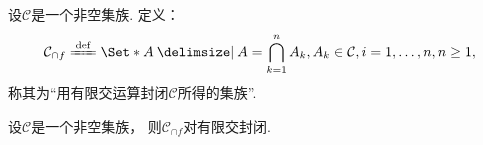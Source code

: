 \begin{definition}
设\(\mathcal{C}\)是一个非空集族.
定义：\[
	\mathcal{C}_{\cap f}
	\defeq
	\Set*{
		A \given
		A = \bigcap_{k=1}^n A_k,
		A_k \in \mathcal{C}, i=1,\dotsc,n,
		n\geq1
	},
\]
称其为“用有限交运算封闭\(\mathcal{C}\)所得的集族”.
\end{definition}

\begin{proposition}
设\(\mathcal{C}\)是一个非空集族，
则\(\mathcal{C}_{\cap f}\)对有限交封闭.
\end{proposition}
